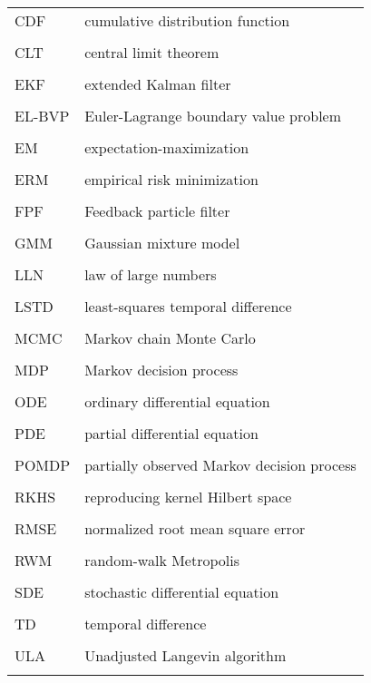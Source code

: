 \begin{tabular}{l p{5in}} %
	CDF & cumulative distribution function \\
	\\
	CLT &  central limit theorem\\
	\\
	EKF & extended Kalman filter \\
	\\
	EL-BVP & Euler-Lagrange boundary value problem\\
	\\
	EM & expectation-maximization\\
	\\
	ERM & empirical risk minimization\\
	\\
	FPF & Feedback particle filter\\
	\\
	GMM & Gaussian mixture model\\
	\\
	LLN & law of large numbers \\
	\\
	LSTD & least-squares temporal difference \\
	\\
	MCMC & Markov chain Monte Carlo \\
	\\
	MDP & Markov decision process \\
	\\
	ODE & ordinary differential equation \\
	\\
	PDE & partial differential equation \\
	\\
	POMDP & partially observed Markov decision process \\
	\\	
	RKHS & reproducing kernel Hilbert space \\
	\\
	RMSE & normalized root mean square error\\
	\\
	RWM & random-walk Metropolis\\
	\\
	SDE & stochastic differential equation\\
	\\
	TD & temporal difference\\
	\\
	ULA & Unadjusted Langevin algorithm \\
	\\
	

\end{tabular}
